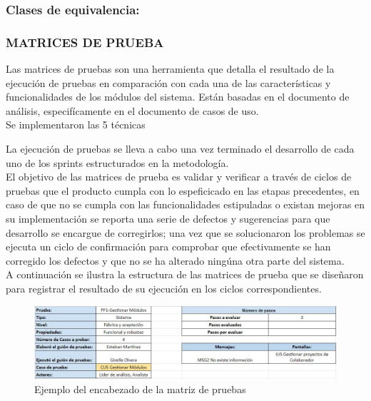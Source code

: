 \subsubsection{Clases de equivalencia:}


\subsubsection{MATRICES DE PRUEBA}

Las matrices de pruebas son una herramienta que detalla el resultado de la ejecución de pruebas en comparación con cada una de las características y funcionalidades de los módulos del sistema. Están basadas en el documento de análisis, especifícamente en el documento de casos de uso.\\

Se implementaron las 5 técnicas 

La ejecución de pruebas se lleva a cabo una vez terminado el desarrollo de cada uno de los sprints estructurados en la metodología.\\

El objetivo de las matrices de prueba es validar y verificar a través de ciclos de pruebas que el producto cumpla con lo espeficicado en las etapas precedentes, en caso de que no se cumpla con las funcionalidades estipuladas o existan mejoras en su implementación se reporta una serie de defectos y sugerencias para que desarrollo se encargue de corregirlos; una vez que se solucionaron los problemas se ejecuta un ciclo de confirmación para comprobar que efectivamente se han corregido los defectos y que no se ha alterado ningúna otra parte del sistema.\\

A continuación se ilustra la estructura de las matrices de prueba que se diseñaron para registrar el resultado de su ejecución en los ciclos correspondientes.\\

\begin{figure}[H]
	\begin{center}
		\includegraphics[width=.95\textwidth]{images/pruebas/diseno/encabezado}
		\caption{Ejemplo del encabezado de la matriz de pruebas}
		\label{fig:encabezado}
	\end{center}
\end{figure}

